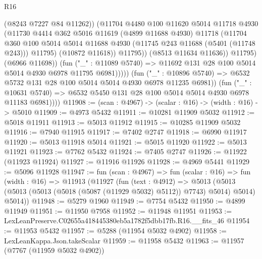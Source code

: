 \begin{lexlean}{R16}
\begin{coremodule}
                              (@8243 @7227 @84 @11262))
                            (@11704
                              @4480
                              @100
                              @11620
                              @5014
                              @11718
                              @4930
                              (@11730
                                @4414
                                @362
                                @5016
                                @11619
                                (@4899 @11688 @4930)
                                @11718
                                (@11704
                                  @360
                                  @100
                                  @5014
                                  @5014
                                  @11688
                                  @4930
                                  (@11745 @243 @11688 (@5401 (@11748 @243)))
                                  @11795)
                                (@10872 @11618))
                              @11795))
                          (@8513 @11634 @11636))
                        @11795)
                      (@6966 @11698))
                    (fun ("_" : @11089 @5740) =>
                    @11692 @131 @28 @100 @5014 @5014 @4930 @6978 @11795 @6981)))))
            (fun ("_" : @10896 @5740) =>
            @6532 @5732 @131 @28 @100 @5014 @5014 @4930 @6978 @11235 @6981))
          (fun ("_" : @10631 @5740) =>
          @6532 @5450 @131 @28 @100 @5014 @5014 @4930 @6978 @11183 @6981))))
@11908 := (scan : @4967) -> (scalar : @16) -> (width : @16) -> @5010
@11909 := @4973 @5432
@11911 := @10281 @11909 @5032
@11912 := @5018 @11911
@11913 := @5013 @11912
@11915 := @10285 @11909 @5032
@11916 := @7940 @11915
@11917 := @7402 @2747
@11918 := @6990 @11917
@11920 := @5013 @11918 @5014
@11921 := @5015 @11920
@11922 := @5013 @11921
@11923 := @7762 @5432
@11924 := @7405 @2747
@11926 := @11922 (@11923 @11924)
@11927 := @11916 @11926
@11928 := @4969 @5441
@11929 := @5096 @11928
@11947 := fun (scan : @4967) =>
  fun (scalar : @16) =>
  fun (width : @16) =>
  @11913
    (@11927
      (fun (text : @4912) =>
      @5013 (@5013 (@5013 (@5013 (@5018 (@5087 (@11929 @5032) @5112)) @7743) @5014) @5014) @5014))
@11948 := @5279 @1960
@11949 := @7754 @5432
@11950 := @4899 @11949
@11951 := @11950 @7958
@11952 := @11948 @11951
@11953 := LexLeanPreserve.C02655a418445380eb5a1782f5dbb17fb.R16.__fits_46
@11954 := @11953 @5432
@11957 := @5288 (@11954 @5032 @4902)
@11958 := LexLeanKappa.Json.takeScalar
@11959 := @11958 @5432
@11963 := @11957 (@7767 (@11959 @5032 @4902))

\end{coremodule}
\end{lexlean}
